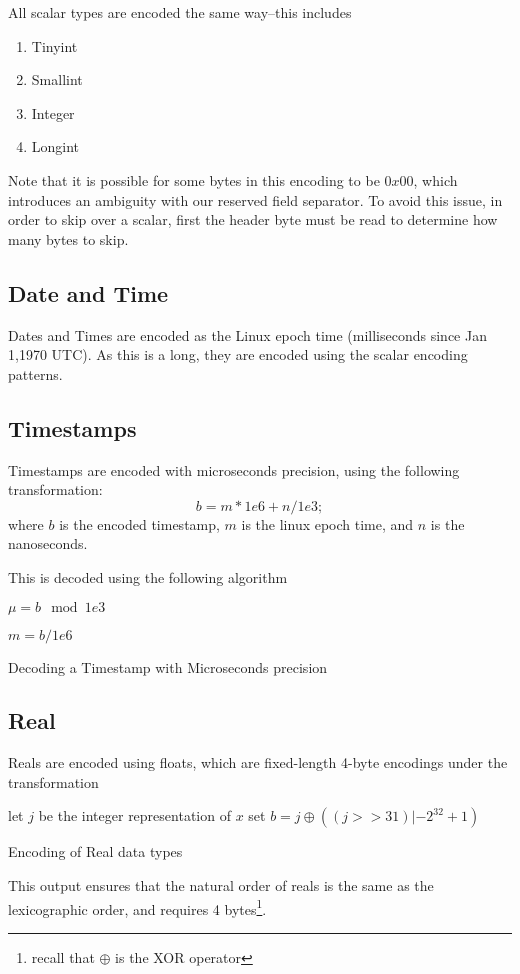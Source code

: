 All scalar types are encoded the same way--this includes

\begin{enumerate}
\item Tinyint
\item Smallint
\item Integer
\item Longint
\end{enumerate}

Note that it is possible for some bytes in this encoding to be $0x00$, which introduces an ambiguity with our reserved field separator. To avoid this issue, in order to skip over a scalar, first the header byte must be read to determine how many bytes to skip.

\subsection{Date and Time}
Dates and Times are encoded as the Linux epoch time (milliseconds since Jan 1,1970 UTC). As this is a long, they are encoded using the scalar encoding patterns.

\subsection{Timestamps}
Timestamps are encoded with microseconds precision, using the following transformation:
\begin{displaymath}
b = m*1e6 + n/1e3;
\end{displaymath}
where $b$ is the encoded timestamp, $m$ is the linux epoch time, and $n$ is the nanoseconds. 

This is decoded using the following algorithm

\begin{algorithm}
	$\mu = b \mod 1e3$\;

	$m = b/1e6$\;
\caption{Decoding a Timestamp with Microseconds precision}
\end{algorithm}

\subsection{Real}
Reals are encoded using floats, which are fixed-length 4-byte encodings under the transformation

\begin{algorithm}
let $j$ be the integer representation of $x$\;
set $b = j \oplus ((j>>31) | -2^{32}+1)$
\caption{Encoding of Real data types}
\end{algorithm}
This output ensures that the natural order of reals is the same as the lexicographic order, and requires 4 bytes\footnote{recall that $\oplus$ is the XOR operator}.

